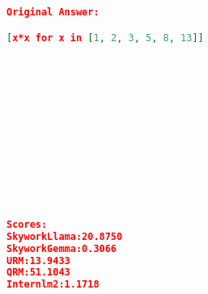 \begin{lstlisting}[language=json,numbers=none]
Original Answer:

[x*x for x in [1, 2, 3, 5, 8, 13]]













Scores:
SkyworkLlama:20.8750
SkyworkGemma:0.3066
URM:13.9433
QRM:51.1043
Internlm2:1.1718
\end{lstlisting}
